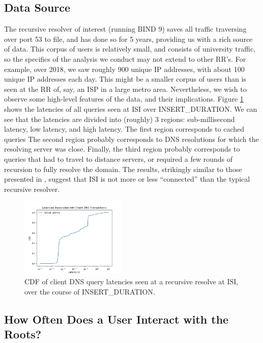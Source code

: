 \documentclass[sigconf,nonacm,10pt]{acmart}
\begin{document}
\subsection{Data Source}\label{data-source}

\label{sec:rr_close_look_data} The recursive resolver of interest
(running BIND 9) saves all traffic traversing over port 53 to file, and
has done so for 5 years, providing us with a rich source of data. This
corpus of users is relatively small, and consists of university traffic,
so the specifics of the analysis we conduct may not extend to other
RR's. For example, over 2018, we saw roughly 900 unique IP addresses,
with about 100 unique IP addresses each day. This might be a smaller
corpus of users than is seen at the RR of, say, an ISP in a large metro
area. Nevertheless, we wish to observe some high-level features of the
data, and their implications. \break
Figure \ref{fig:all_dns_latencies_isi} shows the latencies of all
queries seen at ISI over INSERT\_DURATION. We can see that the latencies
are divided into (roughly) 3 regions: sub-millisecond latency, low
latency, and high latency. The first region corresponds to cached
queries The second region probably corresponds to DNS resolutions for
which the resolving server was close. Finally, the third region probably
corresponds to queries that had to travel to distance servers, or
required a few rounds of recursion to fully resolve the domain. The
results, strikingly similar to those presented in
\cite{callahan2013modern}, suggest that ISI is not more or less
``connected'' than the typical recursive resolver.

\begin{figure}
    \centering
    \includegraphics[width=0.45\textwidth]{figures/all_dns_latencies_isi.png}
    \caption{CDF of client DNS query latencies seen at a recursive resolve at ISI, over the course of INSERT\_DURATION. }
    \label{fig:all_dns_latencies_isi}
\end{figure}

\subsection{How Often Does a User Interact with the
Roots?}\label{how-often-does-a-user-interact-with-the-roots}
\end{document}

